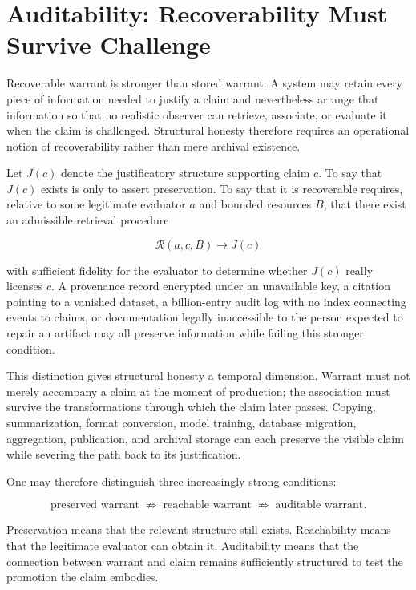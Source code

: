 \documentclass[11pt]{article}
\begin{document}
\section{Auditability: Recoverability Must Survive Challenge}
\label{sec:auditability}

Recoverable warrant is stronger than stored warrant. A system may retain every piece of information needed to justify a claim and nevertheless arrange that information so that no realistic observer can retrieve, associate, or evaluate it when the claim is challenged. Structural honesty therefore requires an operational notion of recoverability rather than mere archival existence.

Let $J(c)$ denote the justificatory structure supporting claim $c$. To say that $J(c)$ exists is only to assert preservation. To say that it is recoverable requires, relative to some legitimate evaluator $a$ and bounded resources $B$, that there exist an admissible retrieval procedure

\[
\mathcal{R}(a,c,B) \longrightarrow J(c)
\]

with sufficient fidelity for the evaluator to determine whether $J(c)$ really licenses $c$. A provenance record encrypted under an unavailable key, a citation pointing to a vanished dataset, a billion-entry audit log with no index connecting events to claims, or documentation legally inaccessible to the person expected to repair an artifact may all preserve information while failing this stronger condition.

This distinction gives structural honesty a temporal dimension. Warrant must not merely accompany a claim at the moment of production; the association must survive the transformations through which the claim later passes. Copying, summarization, format conversion, model training, database migration, aggregation, publication, and archival storage can each preserve the visible claim while severing the path back to its justification.

One may therefore distinguish three increasingly strong conditions:

\[
\text{preserved warrant}
\;\not\Rightarrow\;
\text{reachable warrant}
\;\not\Rightarrow\;
\text{auditable warrant.}
\]

Preservation means that the relevant structure still exists. Reachability means that the legitimate evaluator can obtain it. Auditability means that the connection between warrant and claim remains sufficiently structured to test the promotion the claim embodies.
\end{document}
